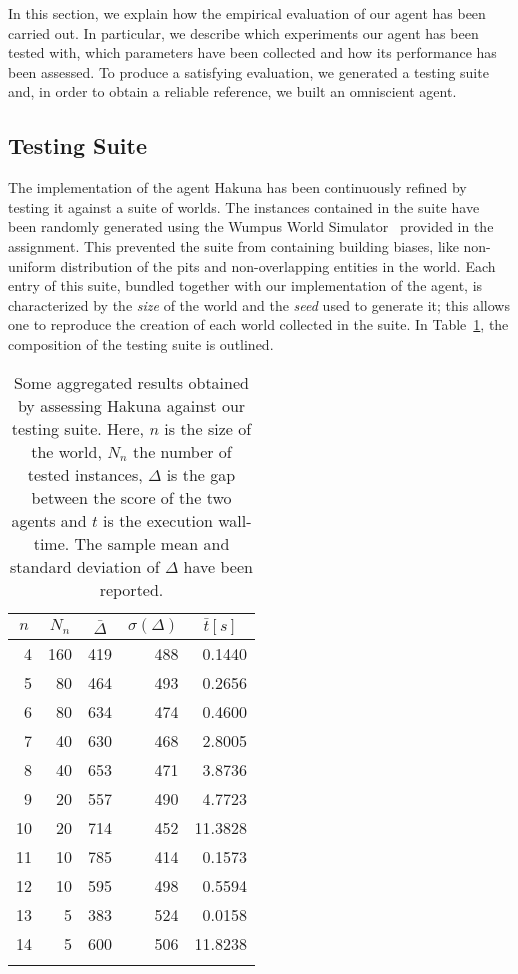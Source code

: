 \documentclass{llncs}
\begin{document}
In this section, we explain how the empirical evaluation of our agent has been carried out.
In particular, we describe which experiments our agent has been tested with, which parameters have been collected and how its performance has been assessed.
To produce a satisfying evaluation, we generated a testing suite and, in order to obtain a reliable reference, we built an omniscient agent.

\subsection{Testing Suite}

The implementation of the agent Hakuna has been continuously refined by testing it against a suite of worlds.
The instances contained in the suite have been randomly generated using the Wumpus World Simulator~\cite{WWS} provided in the assignment.
This prevented the suite from containing building biases, like non-uniform distribution of the pits and non-overlapping entities in the world.
Each entry of this suite, bundled together with our implementation of the agent, is characterized by the \emph{size} of the world and the \emph{seed} used to generate it; this allows one to reproduce the creation of each world collected in the suite.
In Table~\ref{tbl:test}, the composition of the testing suite is outlined.

\begin{table}[t]
	\label{tbl:test}
	\centering
	\begin{tabular}{rrrrr}
	\toprule
	\multicolumn{1}{c}{$n$} & \multicolumn{1}{c}{$N_n$} & \multicolumn{1}{c}{$\bar{\Delta}$} & \multicolumn{1}{c}{$\sigma(\Delta)$} & \multicolumn{1}{c}{$\bar{t} [s]$}\\
	\midrule
	 4 & 160 & 419 & 488 &  0.1440 \\
	 5 &  80 & 464 & 493 &  0.2656 \\
	 6 &  80 & 634 & 474 &  0.4600 \\
	 7 &  40 & 630 & 468 &  2.8005 \\
	 8 &  40 & 653 & 471 &  3.8736 \\
	 9 &  20 & 557 & 490 &  4.7723 \\
	10 &  20 & 714 & 452 & 11.3828 \\
	11 &  10 & 785 & 414 &  0.1573 \\
	12 &  10 & 595 & 498 &  0.5594 \\
	13 &   5 & 383 & 524 &  0.0158 \\
	14 &   5 & 600 & 506 & 11.8238 \\
	\bottomrule\\
	\end{tabular}
	\caption{Some aggregated results obtained by assessing Hakuna against our testing suite. Here, $n$ is the size of the world, $N_n$ the number of tested instances, $\Delta$ is the gap between the score of the two agents and $t$ is the execution wall-time. The sample mean and standard deviation of $\Delta$ have been reported.}
\end{table}
\end{document}
